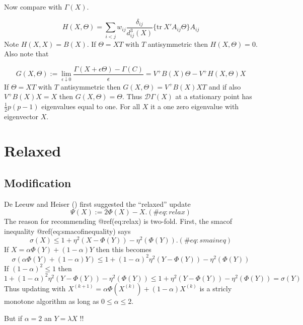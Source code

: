 \documentclass[
  12pt,
  letterpaper,
  DIV=11,
  numbers=noendperiod]{scrartcl}
\begin{document}
Now compare with \(\Gamma(X)\).

\[
H(X,\Theta)=\sum_{i<j} w_{ij}\frac{\delta_{ij}}{d_{ij}^3(X)}\{\text{tr}\ X'A_{ij}\Theta\}A_{ij}
\] Note \(H(X,X)=B(X)\). If \(\Theta=XT\) with \(T\) antisymmetric then
\(H(X,\Theta)=0\). Also note that

\[
G(X,\Theta):=\lim_{\epsilon\downarrow 0}\frac{\Gamma(X+\epsilon\Theta)-\Gamma(C)}{\epsilon}=V^+B(X)\Theta-V^+H(X,\Theta)X
\] If \(\Theta=XT\) with \(T\) antisymmetric then
\(G(X,\Theta)=V^+B(X)XT\) and if also \(V^+B(X)X=X\) then
\(G(X,\Theta)=\Theta\). Thus \(\mathcal{D}\Gamma(X)\) at a stationary
point has \(\frac12p(p-1)\) eigenvalues equal to one. For all \(X\) it a
one zero eigenvalue with eigenvector \(X\).

\section{Relaxed}\label{relaxed}

\subsection{Modification}\label{modification-3}

De Leeuw and Heiser () first
suggested the ``relaxed'' update \begin{equation}
\Psi(X):=2\Phi(X)-X.
(\#eq:relax)
\end{equation} The reason for recommending @ref(eq:relax) is two-fold.
First, the smacof inequality @ref(eq:smacofinequality) says
\begin{equation}
\sigma(X)\leq 1+\eta^2(X-\Phi(Y))-\eta^2(\Phi(Y)).
(\#eq:smaineq)
\end{equation} If \(X=\alpha\Phi(Y)+(1-\alpha)Y\) then this becomes
\begin{equation}
\sigma(\alpha\Phi(Y)+(1-\alpha)Y)\leq 1+(1-\alpha)^2\eta^2(Y-\Phi(Y))-\eta^2(\Phi(Y))
\end{equation} If \((1-\alpha)^2\leq 1\) then \begin{equation}
1+(1-\alpha)^2\eta^2(Y-\Phi(Y))-\eta^2(\Phi(Y))\leq 1+\eta^2(Y-\Phi(Y))-\eta^2(\Phi(Y))=\sigma(Y)
\end{equation} Thus updating with
\(X^{(k+1)}=\alpha\Phi(X^{(k)})+(1-\alpha)X^{(k)}\) is a stricly
monotone algorithm as long as \(0\leq\alpha\leq 2\).

But if \(\alpha=2\) an \(Y=\lambda X\) !!
\end{document}
